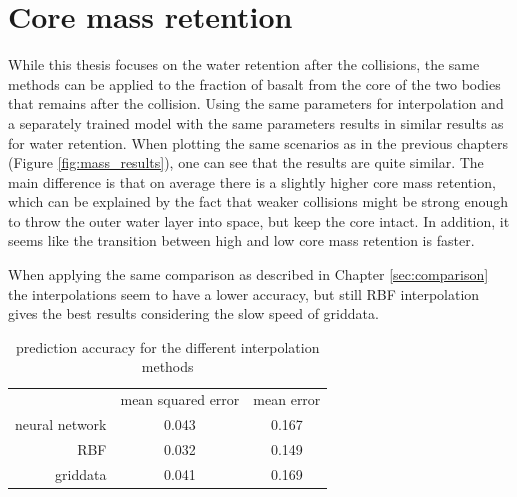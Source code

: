 \chapter{Core mass retention}

While this thesis focuses on the water retention after the collisions, the same methods can be applied to the fraction of basalt from the core of the two bodies that remains after the collision. Using the same parameters for interpolation and a separately trained model with the same parameters results in similar results as for water retention. When plotting the same scenarios as in the previous chapters (Figure \ref{fig:mass_results}), one can see that the results are quite similar. The main difference is that on average there is a slightly higher core mass retention, which can be explained by the fact that weaker collisions might be strong enough to throw the outer water layer into space, but keep the core intact. In addition, it seems like the transition between high and low core mass retention is faster.

When applying the same comparison as described in Chapter \ref{sec:comparison} the interpolations seem to have a lower accuracy, but still RBF interpolation gives the best results considering the slow speed of griddata.


\begin{table}
	\centering
	\begin{tabular}{rcc}
		& {mean squared error} & {mean error} \\
		neural network &        0.043         &    0.167     \\
		RBF &        0.032         &    0.149     \\
		griddata &        0.041         &   0.169
	\end{tabular}
	\caption{prediction accuracy for the different interpolation methods}
	\label{tab:mass_comparison}
\end{table}

